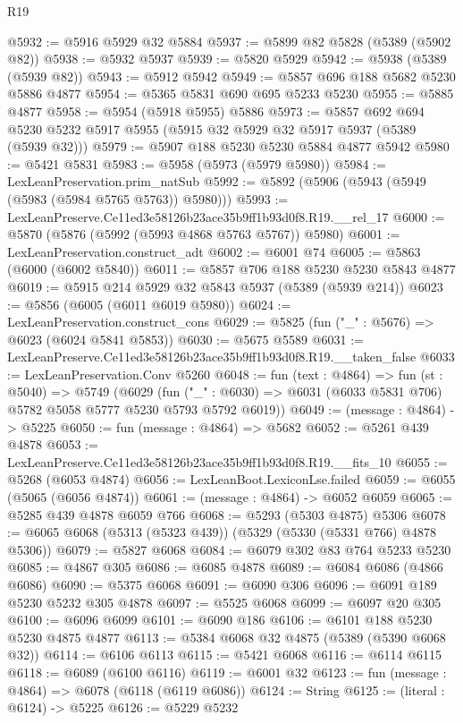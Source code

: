 \begin{lexlean}{R19}
\begin{coremodule}
@5932 := @5916 @5929 @32 @5884
@5937 := @5899 @82 @5828 (@5389 (@5902 @82))
@5938 := @5932 @5937
@5939 := @5820 @5929
@5942 := @5938 (@5389 (@5939 @82))
@5943 := @5912 @5942
@5949 := @5857 @696 @188 @5682 @5230 @5886 @4877
@5954 := @5365 @5831 @690 @695 @5233 @5230
@5955 := @5885 @4877
@5958 := @5954 (@5918 @5955) @5886
@5973 := @5857
    @692
    @694
    @5230
    @5232
    @5917
    @5955
    (@5915 @32 @5929 @32 @5917 @5937 (@5389 (@5939 @32)))
@5979 := @5907 @188 @5230 @5230 @5884 @4877 @5942
@5980 := @5421 @5831
@5983 := @5958 (@5973 (@5979 @5980))
@5984 := LexLeanPreservation.prim_natSub
@5992 := @5892 (@5906 (@5943 (@5949 (@5983 (@5984 @5765 @5763)) @5980)))
@5993 := LexLeanPreserve.Ce11ed3e58126b23ace35b9ff1b93d0f8.R19.__rel_17
@6000 := @5870 (@5876 (@5992 (@5993 @4868 @5763 @5767)) @5980)
@6001 := LexLeanPreservation.construct_adt
@6002 := @6001 @74
@6005 := @5863 (@6000 (@6002 @5840))
@6011 := @5857 @706 @188 @5230 @5230 @5843 @4877
@6019 := @5915 @214 @5929 @32 @5843 @5937 (@5389 (@5939 @214))
@6023 := @5856 (@6005 (@6011 @6019 @5980))
@6024 := LexLeanPreservation.construct_cons
@6029 := @5825 (fun ("_" : @5676) => @6023 (@6024 @5841 @5853))
@6030 := @5675 @5589
@6031 := LexLeanPreserve.Ce11ed3e58126b23ace35b9ff1b93d0f8.R19.__taken_false
@6033 := LexLeanPreservation.Conv @5260
@6048 := fun (text : @4864) =>
  fun (st : @5040) =>
  @5749
    (@6029
      (fun ("_" : @6030) => @6031 (@6033 @5831 @706) @5782 @5058 @5777 @5230 @5793 @5792 @6019))
@6049 := (message : @4864) -> @5225
@6050 := fun (message : @4864) => @5682
@6052 := @5261 @439 @4878
@6053 := LexLeanPreserve.Ce11ed3e58126b23ace35b9ff1b93d0f8.R19.__fits_10
@6055 := @5268 (@6053 @4874)
@6056 := LexLeanBoot.LexiconLse.failed
@6059 := @6055 (@5065 (@6056 @4874))
@6061 := (message : @4864) -> @6052 @6059
@6065 := @5285 @439 @4878 @6059 @766
@6068 := @5293 (@5303 @4875) @5306
@6078 := @6065 @6068 (@5313 (@5323 @439)) (@5329 (@5330 (@5331 @766) @4878 @5306))
@6079 := @5827 @6068
@6084 := @6079 @302 @83 @764 @5233 @5230
@6085 := @4867 @305
@6086 := @6085 @4878
@6089 := @6084 @6086 (@4866 @6086)
@6090 := @5375 @6068
@6091 := @6090 @306
@6096 := @6091 @189 @5230 @5232 @305 @4878
@6097 := @5525 @6068
@6099 := @6097 @20 @305
@6100 := @6096 @6099
@6101 := @6090 @186
@6106 := @6101 @188 @5230 @5230 @4875 @4877
@6113 := @5384 @6068 @32 @4875 (@5389 (@5390 @6068 @32))
@6114 := @6106 @6113
@6115 := @5421 @6068
@6116 := @6114 @6115
@6118 := @6089 (@6100 @6116)
@6119 := @6001 @32
@6123 := fun (message : @4864) => @6078 (@6118 (@6119 @6086))
@6124 := String
@6125 := (literal : @6124) -> @5225
@6126 := @5229 @5232

\end{coremodule}
\end{lexlean}

